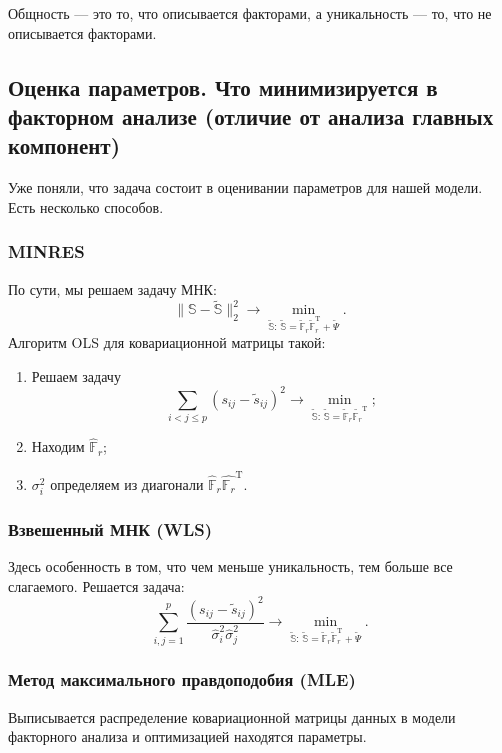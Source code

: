 \documentclass[12pt,a4paper,final]{article}
\newcommand{\1}{\mathds{1}}
\begin{document}
Общность --- это то, что описывается факторами, а уникальность --- то, что не описывается факторами.	 

\subsection{Оценка параметров. Что минимизируется в факторном анализе (отличие от анализа главных компонент)}

Уже поняли, что задача состоит в оценивании параметров для нашей модели.
Есть несколько способов.

\subsubsection*{MINRES}

По сути, мы решаем задачу МНК:
$$
\|\mathbb{S} - \tilde{\mathbb{S}} \|^2_2 \rightarrow \min_{\tilde{\mathbb{S}}:\, \tilde{\mathbb{S}} = \tilde{\mathbb{F}}_r \tilde{\mathbb{F}}_r^\mathrm{T} + \tilde{\Psi}}.
$$
Алгоритм OLS для ковариационной матрицы такой:
\begin{enumerate}
\item Решаем задачу
$$
\sum_{i<j\leqslant p}(s_{ij} - \tilde{s}_{ij})^2 \rightarrow \min_{\tilde{\mathbb{S}}:\, \tilde{\mathbb{S}} = \tilde{\mathbb{F}}_r \tilde{\mathbb{F}_r}^\mathrm{T}};
$$ 
\item Находим $\hat{\mathbb{F}}_r$;
\item $\sigma_i^2$ определяем из диагонали $\hat{\mathbb{F}}_r \hat{\mathbb{F}_r}^\mathrm{T}$.
\end{enumerate}

\subsubsection*{Взвешенный МНК (WLS)}
Здесь особенность в том, что чем меньше уникальность, тем больше все слагаемого. Решается задача:
$$
\sum_{i,j = 1}^p \frac{(s_{ij} - \tilde{s}_{ij})^2}{\hat{\sigma}_i^2 \hat{\sigma}_j^2} \rightarrow \min_{\tilde{\mathbb{S}}:\, \tilde{\mathbb{S}} = \tilde{\mathbb{F}}_r \tilde{\mathbb{F}}_r^\mathrm{T} + \tilde{\Psi}}.
$$

\subsubsection*{Метод максимального правдоподобия (MLE)}
Выписывается распределение ковариационной матрицы данных в модели факторного анализа и оптимизацией находятся параметры.
\end{document}
